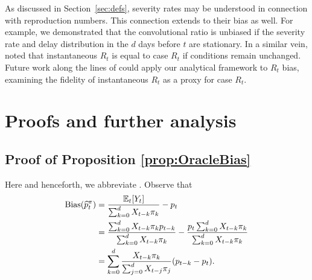 \documentclass{article}
\renewcommand{\hat}{\widehat} %
\newcommand{\given}{\, \vert \,}
\DeclareMathOperator{\bias}{Bias}
\begin{document}
As discussed in Section~\ref{sec:defs}, severity rates may be understood in connection with reproduction numbers. This connection extends to their bias as well. For example, we  demonstrated that the convolutional ratio is unbiased if the severity rate and delay distribution in the $d$ days before $t$ are stationary. In a similar vein, \citet{fraser2007} noted that instantaneous $R_t$ is equal to case $R_t$ if conditions remain unchanged. 
Future work along the lines of \citet{rt_study} could apply our analytical framework to $R_t$ bias, examining the fidelity of instantaneous $R_t$ as a proxy for case $R_t$. 




\clearpage
\appendix

\section{Proofs and further analysis}
\label{apx:proofs}

\subsection{Proof of Proposition \ref{prop:OracleBias}}
\label{apx:OracleBias}

Here and henceforth, we abbreviate \smash{$\E_t[\cdot] = \E[\cdot \given
  \{X_s\}_{s\leq t}]$}. Observe that
\begin{align*}
\bias(\hat{p}_t^\pi) 
&= \frac{\E_t[Y_t]}{\sum_{k=0}^d X_{t-k}\pi_k} - p_t \\ 
&= \frac{\sum_{k=0}^d X_{t-k}\pi_k p_{t-k}}{\sum_{k=0}^d X_{t-k}\pi_k} - 
\frac{p_t \sum_{k=0}^d X_{t-k}\pi_k}{\sum_{k=0}^d X_{t-k}\pi_k} \\
&= \sum_{k=0}^d \frac{X_{t-k}\pi_k}{\sum_{j=0}^d X_{t-j}\pi_j} (p_{t-k}-p_t). 
\end{align*}
 
\end{document}
